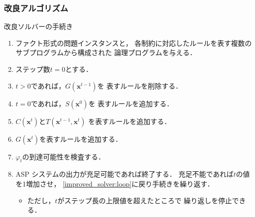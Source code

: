 \begin{frame}
  \frametitle{改良アルゴリズム}

  \begin{block}{改良ソルバーの手続き}
    \begin{enumerate}
      \item ファクト形式の問題インスタンスと，
            各制約に対応したルールを表す複数のサブプログラムから構成された
            論理プログラムを与える．
      \item ステップ数$t=0$とする．
      \item $t>0$であれば，$G(\bm{x}^{t -1})$を
            表すルールを削除する． \label{improved_solver:loop}
      \item $t=0$であれば，$S(\bm{x}^0)$を
            表すルールを追加する．
      \item $C(\bm{x}^{t})$と$T(\bm{x}^{t-1},\bm{x}^{t})$
            を表すルールを追加する．
      \item $G(\bm{x}^{t})$を表すルールを追加する．
      \item $\varphi_{t}$の到達可能性を検査する．
      \item ASP システムの出力が充足可能であれば終了する．
            充足不能であれば$t$の値を1増加させ，
            \ref{improved_solver:loop}に戻り手続きを繰り返す．
            \begin{itemize}
              \item ただし，$t$がステップ長の上限値を超えたところで
                    繰り返しを停止できる．
            \end{itemize} \label{improved_solver:end}
    \end{enumerate}
  \end{block}
\end{frame}
